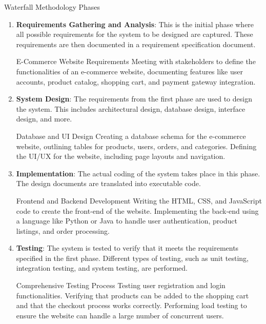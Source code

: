 \begin{conceptcard}{Waterfall Methodology Phases}
  \begin{enumerate}
    \item \textbf{Requirements Gathering and Analysis}: This is the initial phase where all possible requirements for the system to be designed are captured. These requirements are then documented in a requirement specification document.

          \begin{examplecard}{E-Commerce Website Requirements}
            Meeting with stakeholders to define the functionalities of an e-commerce website, documenting features like user accounts, product catalog, shopping cart, and payment gateway integration.
          \end{examplecard}

    \item \textbf{System Design}: The requirements from the first phase are used to design the system. This includes architectural design, database design, interface design, and more.

          \begin{examplecard}{Database and UI Design}
            Creating a database schema for the e-commerce website, outlining tables for products, users, orders, and categories. Defining the UI/UX for the website, including page layouts and navigation.
          \end{examplecard}

    \item \textbf{Implementation}: The actual coding of the system takes place in this phase. The design documents are translated into executable code.

          \begin{examplecard}{Frontend and Backend Development}
            Writing the HTML, CSS, and JavaScript code to create the front-end of the website. Implementing the back-end using a language like Python or Java to handle user authentication, product listings, and order processing.
          \end{examplecard}

    \item \textbf{Testing}: The system is tested to verify that it meets the requirements specified in the first phase. Different types of testing, such as unit testing, integration testing, and system testing, are performed.

          \begin{examplecard}{Comprehensive Testing Process}
            Testing user registration and login functionalities. Verifying that products can be added to the shopping cart and that the checkout process works correctly. Performing load testing to ensure the website can handle a large number of concurrent users.
          \end{examplecard}


\end{enumerate}
\end{conceptcard}
